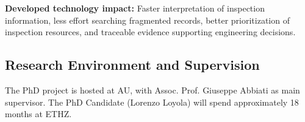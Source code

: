 \documentclass[12pt,a4paper]{article}
\newif\iftemplatenotes
\newcommand{\lengthnote}[1]{%
  \iftemplatenotes
    {\small\itshape\color{gray!70!black} [Target length: #1]}\par\vspace{4pt}
  \fi
}
\begin{document}
%
%
\textbf{Developed technology impact:} Faster interpretation of inspection information, less effort searching fragmented records, better prioritization of inspection resources, and traceable evidence supporting engineering decisions.

\subsection{Research Environment and Supervision}

\justifying
\setlength{\parindent}{0pt}
\setlength{\parskip}{0.8em}
The PhD project is hosted at AU, with Assoc. Prof. Giuseppe Abbiati as main supervisor. The PhD Candidate (Lorenzo Loyola) will spend approximately 18 months at ETHZ.
\end{document}
